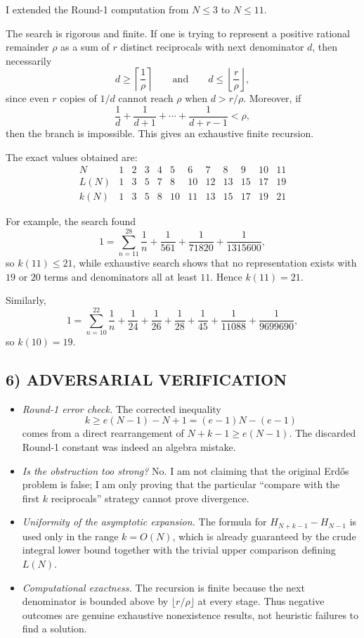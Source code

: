 I extended the Round-1 computation from $N\le 3$ to $N\le 11$.

The search is rigorous and finite. If one is trying to represent a positive rational remainder $\rho$ as a sum of $r$ distinct reciprocals with next denominator $d$, then necessarily
\[
d\ge \left\lceil \frac1{\rho}\right\rceil
\qquad\mbox{and}\qquad
d\le \left\lfloor \frac{r}{\rho}\right\rfloor,
\]
since even $r$ copies of $1/d$ cannot reach $\rho$ when $d>r/\rho$. Moreover, if
\[
\frac1d+\frac1{d+1}+\cdots+\frac1{d+r-1}<\rho,
\]
then the branch is impossible. This gives an exhaustive finite recursion.

The exact values obtained are:
\[
\begin{array}{c|ccccccccccc}
N & 1&2&3&4&5&6&7&8&9&10&11\\ \hline
L(N) & 1&3&5&7&8&10&12&13&15&17&19\\
k(N) & 1&3&5&8&10&11&13&15&17&19&21
\end{array}
\]

For example, the search found
\[
1=\sum_{n=11}^{28}\frac1n+\frac1{561}+\frac1{71820}+\frac1{1315600},
\]
so $k(11)\le 21$, while exhaustive search shows that no representation exists with $19$ or $20$ terms and denominators all at least $11$. Hence $k(11)=21$.

Similarly,
\[
1=\sum_{n=10}^{22}\frac1n+\frac1{24}+\frac1{26}+\frac1{28}+\frac1{45}
+\frac1{11088}+\frac1{9699690},
\]
so $k(10)=19$.

\subsection*{6) ADVERSARIAL VERIFICATION}

\begin{itemize}
\item \emph{Round-1 error check.} The corrected inequality
\[
k\ge e(N-1)-N+1=(e-1)N-(e-1)
\]
comes from a direct rearrangement of $N+k-1\ge e(N-1)$. The discarded Round-1 constant was indeed an algebra mistake.
\item \emph{Is the obstruction too strong?} No. I am not claiming that the original Erd\H{o}s problem is false; I am only proving that the particular ``compare with the first $k$ reciprocals'' strategy cannot prove divergence.
\item \emph{Uniformity of the asymptotic expansion.} The formula for $H_{N+k-1}-H_{N-1}$ is used only in the range $k=O(N)$, which is already guaranteed by the crude integral lower bound together with the trivial upper comparison defining $L(N)$.
\item \emph{Computational exactness.} The recursion is finite because the next denominator is bounded above by $\lfloor r/\rho\rfloor$ at every stage. Thus negative outcomes are genuine exhaustive nonexistence results, not heuristic failures to find a solution.
\end{itemize}

